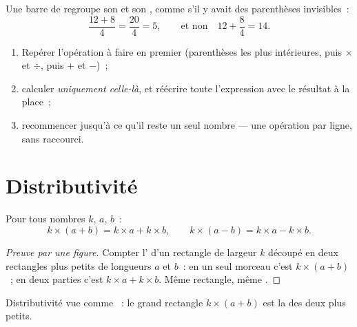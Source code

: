 \begin{remark}
Une barre de  regroupe son  et son ,
comme s'il y avait des parenthèses invisibles~:
\[
\frac{12 + 8}{4} = \frac{20}{4} = 5,
\qquad\text{et non}\quad 12 + \frac{8}{4} = 14 .
\]
\end{remark}

\begin{method}\label{met:g7:priorities:safe}
\begin{enumerate}
  \item Repérer l'opération à faire en premier (parenthèses les plus
        intérieures, puis $\times$ et $\div$, puis $+$ et $-$)~;
  \item calculer \emph{uniquement celle-là}, et réécrire toute
        l'expression avec le résultat à la place~;
  \item recommencer jusqu'à ce qu'il reste un seul nombre --- une
        opération par ligne, sans raccourci.
\end{enumerate}
\end{method}

\section{Distributivité}

\begin{theorem}[Distributivité]\label{thm:g7:priorities:distributivity}
Pour tous nombres $k$, $a$, $b$~:
\[
k \times (a + b) = k \times a + k \times b,
\qquad
k \times (a - b) = k \times a - k \times b .
\]
\end{theorem}

\begin{proof}[Preuve par une figure]
Compter l' d'un rectangle de largeur $k$ découpé en deux
rectangles plus petits de longueurs $a$ et $b$~: en un seul morceau
c'est $k \times (a+b)$~; en deux parties c'est
$k \times a + k \times b$. Même rectangle, même .
\end{proof}

\begin{omfigure}

{\small Distributivité vue comme ~: le grand rectangle
$k \times (a + b)$ est la  des deux plus petits.}
\end{omfigure}

